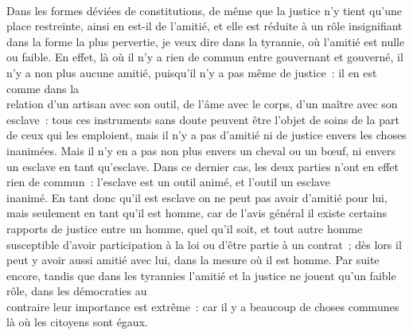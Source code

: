 \documentclass[french,twoside]{book} %
\begin{document}
\\
Dans les formes déviées de constitutions, de même que la justice n’y tient qu’une place restreinte, ainsi en est-il de l’amitié, et elle est réduite à un rôle insignifiant dans la forme la plus pervertie, je veux dire dans la tyrannie, où l’amitié est nulle ou faible. En effet, là où il n’y a rien de commun entre gouvernant et gouverné, il n’y a non plus aucune amitié, puisqu’il n’y a pas même de justice : il en est comme dans la \\
relation d’un artisan avec son outil, de l’âme avec le corps,  d’un maître avec son esclave : tous ces instruments sans doute peuvent être l’objet de soins de la part de ceux qui les emploient, mais il n’y a pas d’amitié ni de justice envers les choses inanimées. Mais il n’y en a pas non plus envers un cheval ou un bœuf, ni envers un esclave en tant qu’esclave. Dans ce dernier cas, les deux parties n’ont en effet rien de commun : l’esclave est un outil animé, et l’outil un esclave \\
inanimé. En tant donc qu’il est esclave on ne peut pas avoir d’amitié pour lui, mais seulement en tant qu’il est homme, car de l’avis général il existe certains rapports de justice entre un homme, quel qu’il soit, et tout autre homme susceptible d’avoir participation à la loi ou d’être partie à un contrat ; dès lors il peut y avoir aussi amitié avec lui, dans la mesure où il est homme. Par suite encore, tandis que dans les tyrannies l’amitié et la justice ne jouent qu’un faible rôle, dans les démocraties au \\
contraire leur importance est extrême : car il y a beaucoup de choses communes là où les citoyens sont égaux.
\end{document}
